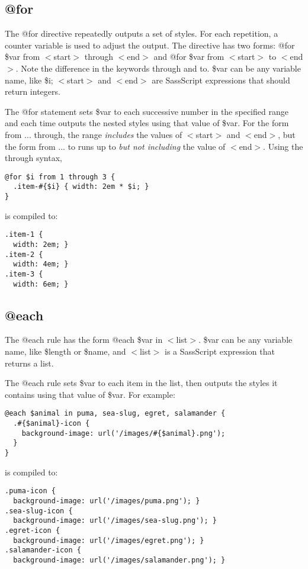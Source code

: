 \documentclass[10pt]{article}
\begin{document}
\subsection{@for}


 The @for directive repeatedly outputs a set of styles. For each repetition, a counter variable is used to adjust the output. The directive has two forms: @for \$var from $<$start$>$ through $<$end$>$ and @for \$var from $<$start$>$ to $<$end$>$. Note the difference in the keywords through and to. \$var can be any variable name, like \$i; $<$start$>$ and $<$end$>$ are SassScript expressions that should return integers.


 The @for statement sets \$var to each successive number in the specified range and each time outputs the nested styles using that value of \$var. For the form from ... through, the range \emph{includes}
 the values of $<$start$>$ and $<$end$>$, but the form from ... to runs up to \emph{but not including}
 the value of $<$end$>$. Using the through syntax,
\begin{verbatim}
@for $i from 1 through 3 {
  .item-#{$i} { width: 2em * $i; }
}
\end{verbatim}


 is compiled to:
\begin{verbatim}
.item-1 {
  width: 2em; }
.item-2 {
  width: 4em; }
.item-3 {
  width: 6em; }
\end{verbatim}
\subsection{@each}


 The @each rule has the form @each \$var in $<$list$>$. \$var can be any variable name, like \$length or \$name, and $<$list$>$ is a SassScript expression that returns a list.


 The @each rule sets \$var to each item in the list, then outputs the styles it contains using that value of \$var. For example:
\begin{verbatim}
@each $animal in puma, sea-slug, egret, salamander {
  .#{$animal}-icon {
    background-image: url('/images/#{$animal}.png');
  }
}
\end{verbatim}


 is compiled to:
\begin{verbatim}
.puma-icon {
  background-image: url('/images/puma.png'); }
.sea-slug-icon {
  background-image: url('/images/sea-slug.png'); }
.egret-icon {
  background-image: url('/images/egret.png'); }
.salamander-icon {
  background-image: url('/images/salamander.png'); }
\end{verbatim}
\end{document}
